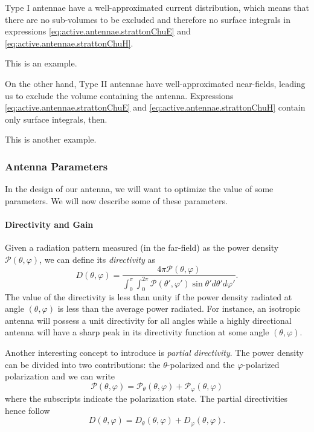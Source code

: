 Type I antennae have a well-approximated current distribution, which means that there are no
sub-volumes to be excluded and therefore no surface integrals in expressions 
\eqref{eq:active.antennae.strattonChuE} and \eqref{eq:active.antennae.strattonChuH}. 
	\begin{exmp}
		This is an example.
	\end{exmp}

On the other hand, Type II antennae have well-approximated near-fields, leading
us to exclude the volume containing the antenna. Expressions \eqref{eq:active.antennae.strattonChuE}
and \eqref{eq:active.antennae.strattonChuH} contain only surface integrals, then.
	\begin{exmp}\label{ex:active.antennae.nearToFarTrans}
		This is another example.
	\end{exmp}

\subsubsection{Antenna Parameters}
In the design of our antenna, we will want to optimize the value
of some parameters. We will now describe some of these parameters.

\paragraph[Directivity and Gain]{Directivity and Gain \cite[\S 1.16]{ELL2003}}
Given a radiation pattern measured (in the far-field) as the power density 
$\mathcal{P}(\theta,\varphi)$, we can define its \textit{directivity}
as
  \begin{equation}
   D(\theta,\varphi) = \frac{4\pi\mathcal{P}(\theta,\varphi)}
			{\int_0^\pi\int_0^{2\pi}\mathcal{P}(\theta',\varphi')\sin\theta'd\theta'd\varphi'}.
  \end{equation}
The value of the directivity is less than unity if the power density radiated at angle $(\theta,\varphi)$
is less than the average power radiated. For instance, an isotropic antenna will possess a unit directivity
for all angles while a highly directional antenna will have a sharp peak  in its directivity function 
at some angle $(\theta,\varphi)$.

Another interesting concept to introduce is \textit{partial directivity}. 
The power density can be divided into two contributions: the $\theta$-polarized
and the $\varphi$-polarized polarization and we can write
  \begin{equation}
    \mathcal{P}(\theta,\varphi) = \mathcal{P}_\theta(\theta,\varphi)+\mathcal{P}_\varphi(\theta,\varphi)
  \end{equation}
where the subscripts indicate the polarization state. The partial 
directivities hence follow
  \begin{equation}
   D(\theta,\varphi) = D_\theta(\theta,\varphi)+D_\varphi(\theta,\varphi).
  \end{equation}

